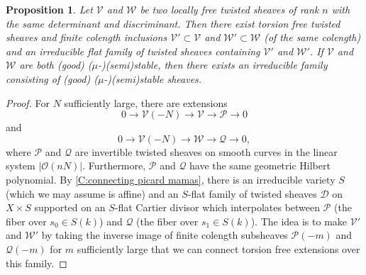 \documentclass[11pt]{amsart}
\newcommand{\ms}[1]{\mathscr #1}
\renewcommand{\[}{[\!\hspace{0.03em}[}
\renewcommand{\]}{]\!\hspace{0.03em}]}
\renewcommand{\(}{(\!\hspace{0.03em}(}
\renewcommand{\)}{)\!\hspace{0.03em})}
\newtheorem{prop}[lem]{Proposition}
\theoremstyle{definition}
\theoremstyle{remark}
\begin{document}
\begin{prop}\label{P:coming together} Let $\ms V$ and $\ms W$ be two locally 
free twisted 
sheaves of rank $n$ with the same determinant and discriminant.  Then there exist torsion 
free twisted sheaves and finite colength inclusions
$\ms V'\subset\ms V$ and $\ms W'\subset\ms W$ (of the same colength) and 
an irreducible flat 
family of twisted sheaves containing $\ms V'$ and $\ms W'$.  If $\ms 
V$ and $\ms W$ are both (good) ($\mu$-)(semi)stable, then there exists an irreducible family 
consisting of (good) ($\mu$-)(semi)stable sheaves.
\end{prop}
\begin{proof} For $N$ sufficiently large, there are extensions
    $$0\to\ms V(-N)\to\ms V\to\ms P\to 0$$
and
    $$0\to\ms V(-N)\to\ms W\to\ms Q\to 0,$$
where $\ms P$ and $\ms Q$ are invertible twisted sheaves on smooth 
curves in the linear system $|{\ms O}(nN)|$.  Furthermore, $\ms P$ and $\ms 
Q$ have the same geometric Hilbert polynomial.  By \ref{C:connecting 
picard mamas}, there is an irreducible variety $S$ (which we may assume 
is affine) and an $S$-flat family 
of twisted sheaves $\ms D$ on $X\times S$ supported on an $S$-flat Cartier divisor 
which interpolates between $\ms P$ (the fiber over $s_{0}\in S(k)$) and $\ms 
Q$ (the fiber over $s_{1}\in S(k)$).  The idea is to make $\ms V'$ 
and $\ms W'$ by taking the inverse image of finite colength 
subsheaves $\ms P(-m)$ and $\ms Q(-m)$ for $m$ sufficiently large 
that we can connect torsion free extensions over this family.


\end{proof}
\end{document}
